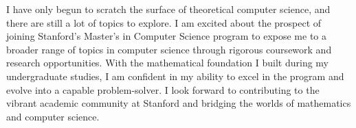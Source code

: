 \documentclass[12pt]{article}
\begin{document}
I have only begun to scratch the surface of theoretical computer science, and there are still a lot
of topics to explore. I am excited about the prospect of joining Stanford's Master's in Computer
Science program to expose me to a broader range of topics in computer science through rigorous
coursework and research opportunities. With the mathematical foundation I built during my
undergraduate studies, I am confident in my ability to excel in the program and evolve into a
capable problem-solver. I look forward to contributing to the vibrant academic community at Stanford
and bridging the worlds of mathematics and computer science.

\newpage



\end{document}

